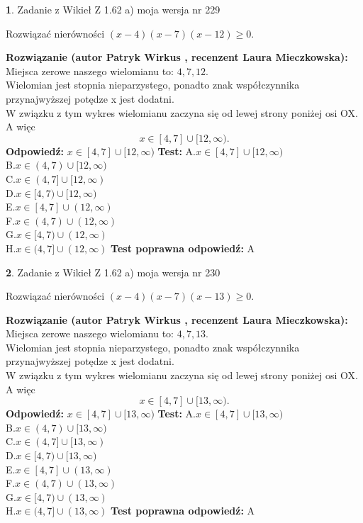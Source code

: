 \documentclass[12pt, a4paper]{article}
\theoremstyle{definition} %
\newtheorem{zad}{}
\newcommand{\zadStart}[1]{\begin{zad}#1\newline}
\newcommand{\zadStop}{\end{zad}}
\newcommand{\rozwStart}[2]{\noindent \textbf{Rozwiązanie (autor #1 , recenzent #2): }\newline}
\newcommand{\rozwStop}{\newline}
\newcommand{\odpStart}{\noindent \textbf{Odpowiedź:}\newline}
\newcommand{\odpStop}{\newline}
\newcommand{\testStart}{\noindent \textbf{Test:}\newline}
\newcommand{\testStop}{\newline}
\newcommand{\kluczStart}{\noindent \textbf{Test poprawna odpowiedź:}\newline}
\newcommand{\kluczStop}{\newline}
\begin{document}
\zadStart{Zadanie z Wikieł Z 1.62 a) moja wersja nr 229}

Rozwiązać nierówności $(x-4)(x-7)(x-12)\ge0$.
\zadStop
\rozwStart{Patryk Wirkus}{Laura Mieczkowska}
Miejsca zerowe naszego wielomianu to: $4, 7, 12$.\\
Wielomian jest stopnia nieparzystego, ponadto znak współczynnika przy\linebreak najwyższej potędze x jest dodatni.\\ W związku z tym wykres wielomianu zaczyna się od lewej strony poniżej osi OX. A więc $$x \in [4,7] \cup [12,\infty).$$
\rozwStop
\odpStart
$x \in [4,7] \cup [12,\infty)$
\odpStop
\testStart
A.$x \in [4,7] \cup [12,\infty)$\\
B.$x \in (4,7) \cup [12,\infty)$\\
C.$x \in (4,7] \cup [12,\infty)$\\
D.$x \in [4,7) \cup [12,\infty)$\\
E.$x \in [4,7] \cup (12,\infty)$\\
F.$x \in (4,7) \cup (12,\infty)$\\
G.$x \in [4,7) \cup (12,\infty)$\\
H.$x \in (4,7] \cup (12,\infty)$
\testStop
\kluczStart
A
\kluczStop



\zadStart{Zadanie z Wikieł Z 1.62 a) moja wersja nr 230}

Rozwiązać nierówności $(x-4)(x-7)(x-13)\ge0$.
\zadStop
\rozwStart{Patryk Wirkus}{Laura Mieczkowska}
Miejsca zerowe naszego wielomianu to: $4, 7, 13$.\\
Wielomian jest stopnia nieparzystego, ponadto znak współczynnika przy\linebreak najwyższej potędze x jest dodatni.\\ W związku z tym wykres wielomianu zaczyna się od lewej strony poniżej osi OX. A więc $$x \in [4,7] \cup [13,\infty).$$
\rozwStop
\odpStart
$x \in [4,7] \cup [13,\infty)$
\odpStop
\testStart
A.$x \in [4,7] \cup [13,\infty)$\\
B.$x \in (4,7) \cup [13,\infty)$\\
C.$x \in (4,7] \cup [13,\infty)$\\
D.$x \in [4,7) \cup [13,\infty)$\\
E.$x \in [4,7] \cup (13,\infty)$\\
F.$x \in (4,7) \cup (13,\infty)$\\
G.$x \in [4,7) \cup (13,\infty)$\\
H.$x \in (4,7] \cup (13,\infty)$
\testStop
\kluczStart
A
\kluczStop
\end{document}
